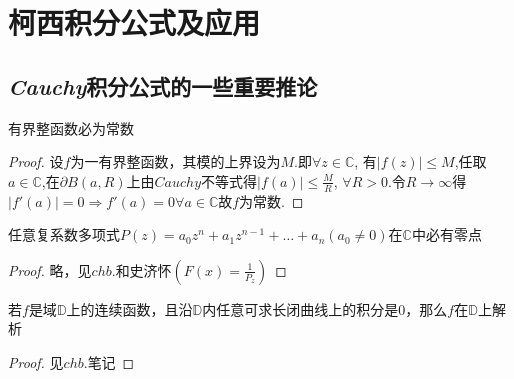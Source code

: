 \chapter{柯西积分公式及应用}

\section{\emph{Cauchy}积分公式的一些重要推论}

\begin{mypro}[Liouville定理]
	有界整函数必为常数
\end{mypro}
\begin{proof}
	设$f$为一有界整函数，其模的上界设为$M$.即$\forall z\in\mathbb{C}$,
	有$|f(z)|\leq M$,任取$a\in\mathbb{C}$,在$\partial$$B(a,R)$上由$Cauchy$不等式得$\displaystyle{|f(a)|\le\frac{M}{R}}$,
	$\forall R>0$.令$R\rightarrow\infty$得$|f'(a)|=0\Rightarrow f'(a)=0\forall a\in\mathbb{C}$故$f$为常数.
\end{proof}

\begin{mypro}[代数基本定理]
	任意复系数多项式$P(z)=a_{0}z^{n}+a_{1}z^{n-1}+\dots+a_{n}$\quad$(a_{0}\neq0)$在$\mathbb{C}$中必有零点
\end{mypro}
\begin{proof}
	略，见$chb.$和史济怀\quad$\displaystyle{(F(x)=\frac{1}{P_{z}})}$
\end{proof}

\begin{mypro}[Morera]
	若$f$是域$\mathbb{D}$上的连续函数，且沿$\mathbb{D}$内任意可求长闭曲线上的积分是0，那么$f$在$\mathbb{D}$上解析
\end{mypro}
\begin{proof}
	见$chb.$笔记
\end{proof}


